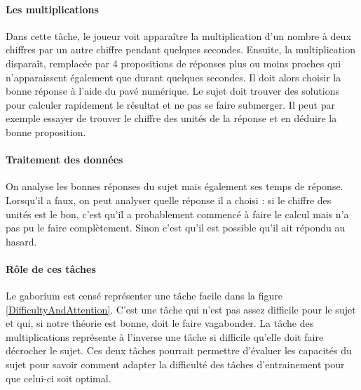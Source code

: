 \paragraph{Les multiplications}Dans cette tâche, le joueur voit apparaître la multiplication d'un nombre à deux chiffres par un autre chiffre pendant quelques secondes. Ensuite, la
multiplication disparaît, remplacée par 4 propositions de réponses plus ou moins proches qui n'apparaissent également que durant quelques secondes. Il doit alors choisir la bonne
réponse à l'aide du pavé numérique. Le sujet doit trouver des solutions pour calculer rapidement le résultat et ne pas se faire submerger. Il peut par exemple essayer de trouver le
chiffre des unités de la réponse et en déduire la bonne proposition.

\paragraph{Traitement des données}On analyse les bonnes réponses du sujet mais également ses temps de réponse. Lorsqu'il a faux, on peut analyser quelle réponse il a choisi : si le
chiffre des unités est le bon, c'est qu'il a probablement commencé à faire le calcul mais n'a pas pu le faire complètement. Sinon c'est qu'il est possible qu'il ait répondu au hasard.


\paragraph{Rôle de ces tâches}Le gaborium est censé représenter une tâche facile dans la figure \ref{DifficultyAndAttention}. C'est une tâche qui n'est pas assez difficile pour le
sujet et qui, si notre théorie est bonne, doit le faire vagabonder. La tâche des multiplications représente à l'inverse une tâche si difficile qu'elle doit faire décrocher le sujet.
Ces deux tâches pourrait permettre d'évaluer les capacités du sujet pour savoir comment adapter la difficulté des tâches d'entrainement pour que celui-ci soit optimal.